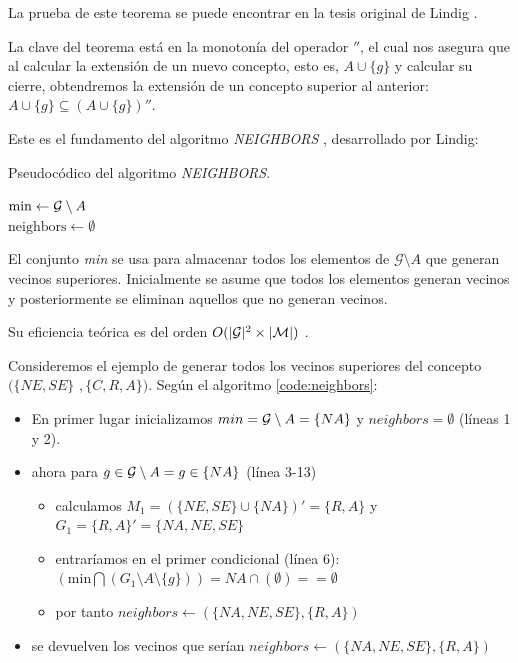 \documentclass[oneside,openright,titlepage,numbers=noenddot,openany,headinclude,footinclude=true,
cleardoublepage=empty,abstractoff,BCOR=5mm,paper=a4,fontsize=12pt,main=spanish]{scrreprt}
\begin{document}
La prueba de este teorema se puede encontrar en la tesis original de Lindig \cite{lindig99thesis}.

La clave del teorema está en la monotonía del operador $''$, el cual nos asegura que al calcular la extensión de un nuevo concepto, esto es, $A \cup \{g\}$ y calcular su cierre, obtendremos la extensión de un concepto superior al anterior: $A \cup \{g\} \subseteq (A \cup \{g\})''$.

Este es el fundamento del algoritmo \textit{NEIGHBORS} \cite{lindig_concept-based_nodate}, desarrollado por Lindig:

\begin{algorithm}[h]
\caption{Pseudocódico del algoritmo \textit{NEIGHBORS}.}
\label{code:neighbors}
    
    $\text{min} \leftarrow \mathcal{G} \setminus A$\\
    $\text{neighbors} \leftarrow \emptyset$\\
\end{algorithm}

El conjunto \textit{min} se usa para almacenar todos los elementos de $\mathcal{G}\setminus A$ que generan vecinos superiores. Inicialmente se asume que todos los elementos generan vecinos y posteriormente se eliminan aquellos que no generan vecinos. 

Su eficiencia teórica es del orden $O(|\mathcal{G}|^2 \times |\mathcal{M}|)$ \cite{lindig_concept-based_nodate}.

Consideremos el ejemplo de generar todos los vecinos superiores del concepto $(\{NE,SE\}$ $,\{C,R,A\})$. Según el algoritmo \ref{code:neighbors}:

\begin{itemize}
    \item En primer lugar inicializamos $min=\mathcal{G} \setminus A = \{NA\}$ y $neighbors=\emptyset$ (líneas 1 y 2).
    \item ahora para $g \in \mathcal{G} \setminus A = g \in \{NA\}$ (línea 3-13)
    \begin{itemize}
        \item calculamos $M_1=(\{NE,SE\} \cup \{NA\})'=\{R,A\}$ y $G_1=\{R,A\}'=\{NA, NE, SE\}$
        \item entraríamos en el primer condicional (línea 6): $(\text{min} \bigcap (G_1 \setminus A \setminus \{g\}))= NA \cap (\emptyset) == \emptyset$
        \item por tanto $neighbors \leftarrow (\{NA,NE,SE\},\{R,A\})$
    \end{itemize}
    \item se devuelven los vecinos que serían $neighbors \leftarrow (\{NA,NE,SE\},\{R,A\})$
\end{itemize}
\end{document}
